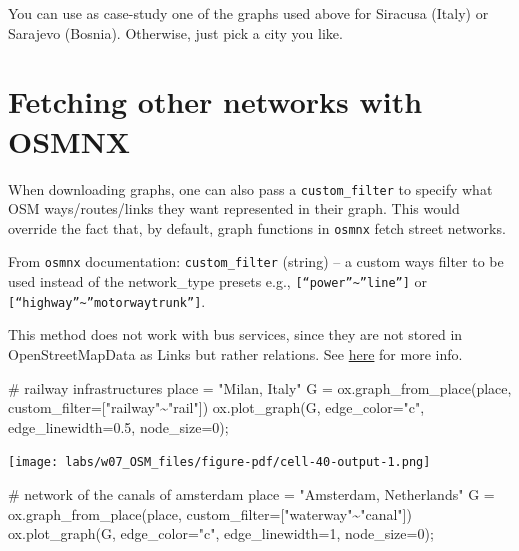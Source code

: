 \documentclass[
  letterpaper,
  DIV=11,
  numbers=noendperiod]{scrreprt}
\newenvironment{Shaded}{\begin{snugshade}}{\end{snugshade}}
\newcommand{\CommentTok}[1]{\textcolor[rgb]{0.37,0.37,0.37}{#1}}
\newcommand{\DecValTok}[1]{\textcolor[rgb]{0.68,0.00,0.00}{#1}}
\newcommand{\FloatTok}[1]{\textcolor[rgb]{0.68,0.00,0.00}{#1}}
\newcommand{\NormalTok}[1]{\textcolor[rgb]{0.00,0.23,0.31}{#1}}
\newcommand{\OperatorTok}[1]{\textcolor[rgb]{0.37,0.37,0.37}{#1}}
\newcommand{\StringTok}[1]{\textcolor[rgb]{0.13,0.47,0.30}{#1}}
\begin{document}
You can use as case-study one of the graphs used above for Siracusa
(Italy) or Sarajevo (Bosnia). Otherwise, just pick a city you like.

\section{Fetching other networks with
OSMNX}\label{fetching-other-networks-with-osmnx}

When downloading graphs, one can also pass a \texttt{custom\_filter} to
specify what OSM ways/routes/links they want represented in their graph.
This would override the fact that, by default, graph functions in
\texttt{osmnx} fetch street networks.

From \texttt{osmnx} documentation: \texttt{custom\_filter} (string) -- a
custom ways filter to be used instead of the network\_type presets e.g.,
\texttt{{[}“power”\textasciitilde{}”line”{]}} or
\texttt{{[}“highway”\textasciitilde{}”motorway\textbar{}trunk”{]}}.

This method does not work with bus services, since they are not stored
in OpenStreetMapData as Links but rather relations. See
\href{https://wiki.openstreetmap.org/wiki/Buses}{here} for more info.

\begin{Shaded}
\begin{Highlighting}[]
\CommentTok{\# railway infrastructures}
\NormalTok{place }\OperatorTok{=} \StringTok{"Milan, Italy"}
\NormalTok{G }\OperatorTok{=}\NormalTok{ ox.graph\_from\_place(place, custom\_filter}\OperatorTok{=}\StringTok{\textquotesingle{}["railway"\textasciitilde{}"rail"]\textquotesingle{}}\NormalTok{)}
\NormalTok{ox.plot\_graph(G, edge\_color}\OperatorTok{=}\StringTok{"c"}\NormalTok{, edge\_linewidth}\OperatorTok{=}\FloatTok{0.5}\NormalTok{, node\_size}\OperatorTok{=}\DecValTok{0}\NormalTok{)}\OperatorTok{;}
\end{Highlighting}
\end{Shaded}

\texttt{[image: labs/w07\_OSM\_files/figure-pdf/cell-40-output-1.png]}

\begin{Shaded}
\begin{Highlighting}[]
\CommentTok{\# network of the canals of amsterdam}
\NormalTok{place }\OperatorTok{=} \StringTok{"Amsterdam, Netherlands"}
\NormalTok{G }\OperatorTok{=}\NormalTok{ ox.graph\_from\_place(place, custom\_filter}\OperatorTok{=}\StringTok{\textquotesingle{}["waterway"\textasciitilde{}"canal"]\textquotesingle{}}\NormalTok{)}
\NormalTok{ox.plot\_graph(G, edge\_color}\OperatorTok{=}\StringTok{"c"}\NormalTok{, edge\_linewidth}\OperatorTok{=}\DecValTok{1}\NormalTok{, node\_size}\OperatorTok{=}\DecValTok{0}\NormalTok{)}\OperatorTok{;}
\end{Highlighting}
\end{Shaded}
\end{document}
